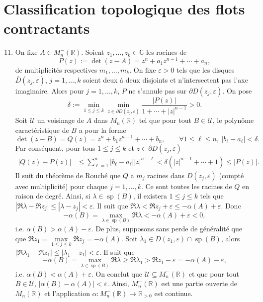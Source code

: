 \documentclass[french]{article}
\theoremstyle{definition}
\newcommand{\ol}[1]{\overline{#1}}
\newcommand{\Cbb}{\mathbb{C}}
\newcommand{\Rbb}{\mathbb{R}}
\newcommand{\Ucal}{\mathcal{U}}
\newcommand{\spec}{\operatorname{sp}}
\begin{document}
\section*{Classification topologique des flots contractants}


\begin{enumerate}
    \setcounter{enumi}{10}
    \item \label{Partie11} On fixe $A \in M_n^{-}(\Rbb)$. Soient $z_1,\ldots,z_k \in \Cbb$ les racines de 
        $$P(z) := \det(z - A) = z^n + a_1z^{n-1} + \cdots + a_n,$$
    de multiplicit\'es respectives $m_1,\ldots,m_k$. On fixe $\varepsilon > 0$ tels que les disques $\ol{D}(z_j,\varepsilon)$, $j = 1,\ldots,k$ soient deux \`a deux disjoints et n'intersectent pas l'axe imaginaire. Alors pour $j = 1,\ldots,k$, $P$ ne s'annule pas sur $\partial D(z_j,\varepsilon)$. On pose
        $$\delta:=\min_{1 \le j \le k}\min_{z \in \partial D(z_j,\varepsilon)}\frac{|P(z)|}{1 + \cdots + |z|^{n-1}} > 0.$$
    Soit $\Ucal$ un voisinage de $A$ dans $M_n(\Rbb)$ tel que pour tout $B \in \Ucal$, le polyn\^ome caract\'eristique de $B$ a pour la forme
        $$\det(z - B) = Q(z) = z^n + b_1z^{n-1} + \cdots + b_n, \qquad \forall 1 \le \ell \le n,\ |b_\ell - a_\ell| < \delta.$$
    Par cons\'equent, pour tous $1 \le j \le k$ et $z \in \partial D(z_j,\varepsilon)$
        \begin{align*}
            |Q(z) - P(z)| & \le \sum_{\ell = 1}^n |b_\ell - a_\ell||z|^{n - \ell}
            < \delta(|z|^{n-1} + \cdots + 1)
             \le |P(z)|.
        \end{align*}
    Il suit du th\'eor\`eme de Rouch\'e que $Q$ a $m_j$ racines dans $D(z_j,\varepsilon)$ (compt\'e avec multiplicit\'e) pour chaque $j = 1,\ldots,k$. Ce sont toutes les racines de $Q$ en raison de degr\'e. Ainsi, si $\lambda \in \spec(B)$, il existera $1 \le j \le k$ tels que $|\Re\lambda - \Re z_j| \le |\lambda - z_j| < \varepsilon$. Il suit que $\Re \lambda < \Re z_j + \varepsilon \le -\alpha(A) + \varepsilon$. Donc
        $$-\alpha(B) = \max_{\lambda \in \spec(B)} \Re \lambda < -\alpha(A) + \varepsilon < 0,$$
    i.e. $\alpha(B) > \alpha(A) - \varepsilon$. De plus, supposons sans perde de g\'en\'eralit\'e que que $\Re z_1 = \max\limits_{1 \le j \le k}\Re z_j = -\alpha(A)$. Soit $\lambda_1 \in D(z_1,\varepsilon) \cap \spec(B)$, alors $|\Re \lambda_1 - \Re z_1| \le |\lambda_1 - z_1| < \varepsilon$. Il suit que
        $$-\alpha(B) = \max_{\lambda \in \spec(B)}\Re \lambda \ge \Re \lambda_1 > \Re z_1 - \varepsilon = -\alpha(A) - \varepsilon,$$
    i.e. $\alpha(B) < \alpha(A) + \varepsilon$. On conclut que $\Ucal \subseteq M_n^{-}(\Rbb)$ et que pour tout $B \in \Ucal$, $|\alpha(B) - \alpha(A)| < \varepsilon$. Ainsi, $M_n^{-}(\Rbb)$ est une partie ouverte de $M_n(\Rbb)$ et l'application $\alpha: M_n^{-}(\Rbb) \to \Rbb_{> 0}$ est continue.
    

\end{enumerate}
\end{document}

